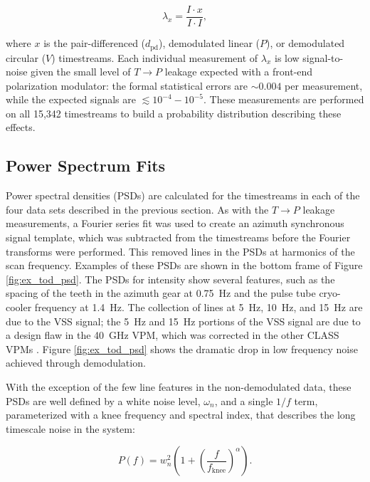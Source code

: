 \documentclass[twocolumn, tighten, numberedappendix, twocolappendix]{aastex63}
\newcommand{\nTotalTimestreams}{15,342 }
\begin{document}
\begin{equation}
    \lambda_x = \frac{ I\cdot x}{ I\cdot I },
\end{equation}

\noindent where $x$ is the pair-differenced ($d_\mathrm{pd}$), demodulated linear ($P$), or demodulated circular ($V$) timestreams. Each individual measurement of $\lambda_x$ is low signal-to-noise given the small level of $T\rightarrow P$ leakage expected with a front-end polarization modulator: the formal statistical errors are $\sim0.004$ per measurement, while the expected signals are $\lesssim 10^{-4} - 10^{-5}$. These measurements are performed on all \nTotalTimestreams timestreams to build a probability distribution describing these effects.

\subsection{\label{sec:method_psd}Power Spectrum Fits}

Power spectral densities (PSDs) are calculated for the timestreams in each of the four data sets described in the previous section. As with the $T\rightarrow P$ leakage measurements, a Fourier series fit was used to create an azimuth synchronous signal template, which was subtracted from the timestreams before the Fourier transforms were performed. This removed lines in the PSDs at harmonics of the scan frequency. Examples of these PSDs are shown in the bottom frame of Figure \ref{fig:ex_tod_psd}. The PSDs for intensity show several features, such as the spacing of the teeth in the azimuth gear at 0.75~Hz and the pulse tube cryo-cooler frequency at 1.4~Hz. The collection of lines at 5~Hz, 10~Hz, and 15~Hz are due to the VSS signal; the 5~Hz and 15~Hz portions of the VSS signal are due to a design flaw in the 40~GHz VPM, which was corrected in the other CLASS VPMs \citep{harr18}. Figure \ref{fig:ex_tod_psd} shows the dramatic drop in low frequency noise achieved through demodulation.

With the exception of the few line features in the non-demodulated data, these PSDs are well defined by a white noise level, $\omega_n$, and a single $1/f$ term, parameterized with a knee frequency and spectral index, that describes the long timescale noise in the system:

\begin{equation}
    P(f) = w_n^2 \left(1+\left( \frac{f}{f_\mathrm{knee}} \right)^\alpha \right).
    \label{eq:one_over_f}
\end{equation}
\end{document}
